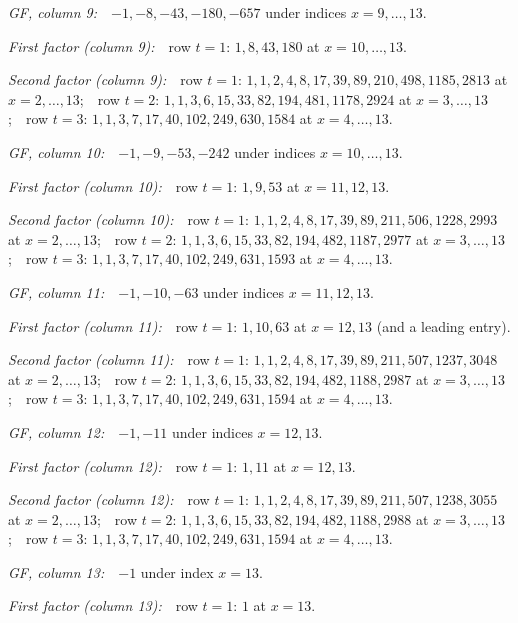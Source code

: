 \documentclass[11pt,a4paper]{article}
\begin{document}
\medskip

\noindent\textit{GF, column 9:}\ \ $-1,-8,-43,-180,-657$ under indices $x=9,\ldots,13$.

\noindent\textit{First factor (column 9):}\ \ row $t=1$: $1,8,43,180$ at $x=10,\ldots,13$.

\noindent\textit{Second factor (column 9):}\ \ row $t=1$: $1,1,2,4,8,17,39,89,210,498,1185,2813$ at $x=2,\ldots,13$;\ \ row $t=2$: $1,1,3,6,15,33,82,194,481,1178,2924$ at $x=3,\ldots,13$;\ \ row $t=3$: $1,1,3,7,17,40,102,249,630,1584$ at $x=4,\ldots,13$.

\medskip

\noindent\textit{GF, column 10:}\ \ $-1,-9,-53,-242$ under indices $x=10,\ldots,13$.

\noindent\textit{First factor (column 10):}\ \ row $t=1$: $1,9,53$ at $x=11,12,13$.

\noindent\textit{Second factor (column 10):}\ \ row $t=1$: $1,1,2,4,8,17,39,89,211,506,1228,2993$ at $x=2,\ldots,13$;\ \ row $t=2$: $1,1,3,6,15,33,82,194,482,1187,2977$ at $x=3,\ldots,13$;\ \ row $t=3$: $1,1,3,7,17,40,102,249,631,1593$ at $x=4,\ldots,13$.

\medskip

\noindent\textit{GF, column 11:}\ \ $-1,-10,-63$ under indices $x=11,12,13$.

\noindent\textit{First factor (column 11):}\ \ row $t=1$: $1,10,63$ at $x=12,13$ (and a leading entry).

\noindent\textit{Second factor (column 11):}\ \ row $t=1$: $1,1,2,4,8,17,39,89,211,507,1237,3048$ at $x=2,\ldots,13$;\ \ row $t=2$: $1,1,3,6,15,33,82,194,482,1188,2987$ at $x=3,\ldots,13$;\ \ row $t=3$: $1,1,3,7,17,40,102,249,631,1594$ at $x=4,\ldots,13$.

\medskip

\noindent\textit{GF, column 12:}\ \ $-1,-11$ under indices $x=12,13$.

\noindent\textit{First factor (column 12):}\ \ row $t=1$: $1,11$ at $x=12,13$.

\noindent\textit{Second factor (column 12):}\ \ row $t=1$: $1,1,2,4,8,17,39,89,211,507,1238,3055$ at $x=2,\ldots,13$;\ \ row $t=2$: $1,1,3,6,15,33,82,194,482,1188,2988$ at $x=3,\ldots,13$;\ \ row $t=3$: $1,1,3,7,17,40,102,249,631,1594$ at $x=4,\ldots,13$.

\medskip

\noindent\textit{GF, column 13:}\ \ $-1$ under index $x=13$.

\noindent\textit{First factor (column 13):}\ \ row $t=1$: $1$ at $x=13$.
\end{document}

